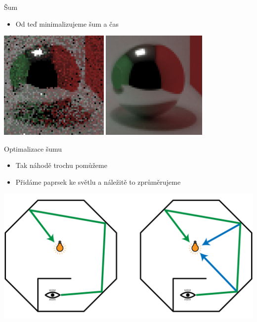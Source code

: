 \documentclass[czech]{beamer}
\begin{document}
\begin{frame}{Šum}
\begin{itemize}
  \item Od teď minimalizujeme šum a čas
\end{itemize}
\centering \includegraphics[width=0.4\textwidth]{img/1 sample.png}
\centering \includegraphics[width=0.386\textwidth]{img/1000 samples.png}
\\
\end{frame}


\begin{frame}{Optimalizace šumu}
\begin{itemize}
  \item Tak náhodě trochu pomůžeme
  \item Přidáme paprsek ke světlu a náležitě to zprůměrujeme
\end{itemize}
\vfill
\centering \includegraphics[width=0.8\linewidth]{img/light sampling.png}
\end{frame}
\end{document}
